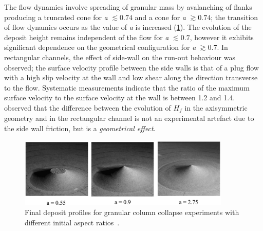 The flow dynamics involve spreading of granular mass 
by avalanching of flanks producing a truncated cone for \textit{a} $\lesssim 
0.74$ and a cone for \textit{a} $\gtrsim 0.74$; the transition of flow dynamics 
occurs as the value of \textit{a} is increased (\cref{fig:cone}). The evolution 
of the deposit height remains independent of the flow for \textit{a} $\lesssim 
0.7$, however it exhibits significant dependence on the geometrical 
configuration for \textit{a} $\gtrsim 0.7$. In rectangular channels, the effect 
of side-wall on the run-out behaviour was observed; the surface velocity 
profile between the 
side walls is that of a plug flow with a high slip velocity at the wall and low 
shear along the direction transverse to the flow. Systematic measurements 
indicate that the ratio of the maximum surface velocity to the surface velocity 
at the wall is between 1.2 and 1.4.~\citet{Lajeunesse2005} observed that the 
difference between the evolution of $\textit{H}_{\textit{f}}$ in the 
axisymmetric geometry and in the rectangular channel is not an experimental 
artefact due to the side wall friction, but is a \textit{geometrical effect}. 

\begin{figure}
\centering
\includegraphics[width=0.9\textwidth]{cone}
\caption{Final deposit profiles for granular column collapse experiments with 
different initial aspect ratios~\citep{Lube2005}.}
\label{fig:cone}
\end{figure}


